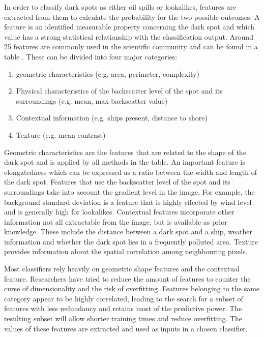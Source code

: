 In order to classify dark spots as either oil spills or lookalikes, features are extracted from them to calculate the probability for the two possible outcomes. A feature is an identified measurable property concerning the dark spot and which value has a strong statistical relationship with the classification output. Around 25 features are commonly used in the scientific community and can be found in a table \cite{Topouzelis200930}. These can be divided into four major categories\cite{Brekke200595}:
\begin{enumerate}
\item geometric characteristics (e.g. area, perimeter, complexity)
\item Physical characteristics of the backscatter level of the spot and its surroundings (e.g. mean, max backscatter value)
\item Contextual information (e.g. ships present, distance to shore)
\item Texture (e.g. mean contrast)
\end{enumerate}

Geometric characteristics are the features that are related to the shape of the dark spot and is applied by all methods in the table\cite{Topouzelis200930}. An important feature is elongatedness which can be expressed as a ratio between the width and length of the dark spot\cite{Gasull20071}. Features that use the backscatter level of the spot and its surroundings take into account the gradient level in the image. For example, the background standard deviation is a feature that is highly effected by wind level and is generally high for lookalikes. Contextual features incorporate other information not all extractable from the image, but is available as prior knowledge. These include the distance between a dark spot and a ship, weather information and whether the dark spot lies in a frequently polluted area. Texture provides information about the spatial correlation among neighbouring pixels.

Most classifiers rely heavily on geometric shape features and the contextual feature.\cite{Xu201414} Researchers have tried to reduce the amount of features to counter the curse of dimensionality and the risk of overfitting. Features belonging to the same category appear to be highly correlated\cite{Xu201414}, leading to the search for a subset of features with less redundancy and retains most of the predictive power\cite{Topouzelis200930}. The resulting subset will allow shorter training times and reduce overfitting. The values of these features are extracted and used as inputs in a chosen classifier.
